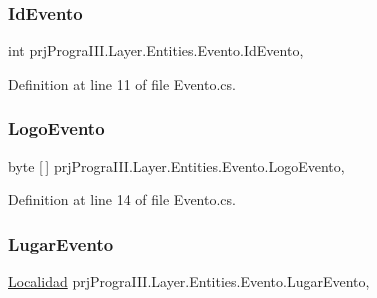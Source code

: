 \subsubsection{\texorpdfstring{Id\+Evento}{IdEvento}}
{\footnotesize\ttfamily int prj\+Progra\+I\+I\+I.\+Layer.\+Entities.\+Evento.\+Id\+Evento\hspace{0.3cm}{\ttfamily [get]}, {\ttfamily [set]}}



Definition at line 11 of file Evento.\+cs.

\hypertarget{classprj_progra_i_i_i_1_1_layer_1_1_entities_1_1_evento_a05a4b78092cc7e2b55e526addc05217f}{}\label{classprj_progra_i_i_i_1_1_layer_1_1_entities_1_1_evento_a05a4b78092cc7e2b55e526addc05217f} 
\subsubsection{\texorpdfstring{Logo\+Evento}{LogoEvento}}
{\footnotesize\ttfamily byte \mbox{[}$\,$\mbox{]} prj\+Progra\+I\+I\+I.\+Layer.\+Entities.\+Evento.\+Logo\+Evento\hspace{0.3cm}{\ttfamily [get]}, {\ttfamily [set]}}



Definition at line 14 of file Evento.\+cs.

\hypertarget{classprj_progra_i_i_i_1_1_layer_1_1_entities_1_1_evento_ad7671027bd2f81cee1865e1e77839ab0}{}\label{classprj_progra_i_i_i_1_1_layer_1_1_entities_1_1_evento_ad7671027bd2f81cee1865e1e77839ab0} 
\subsubsection{\texorpdfstring{Lugar\+Evento}{LugarEvento}}
{\footnotesize\ttfamily \hyperlink{classprj_progra_i_i_i_1_1_layer_1_1_entities_1_1_localidad}{Localidad} prj\+Progra\+I\+I\+I.\+Layer.\+Entities.\+Evento.\+Lugar\+Evento\hspace{0.3cm}{\ttfamily [get]}, {\ttfamily [set]}}



